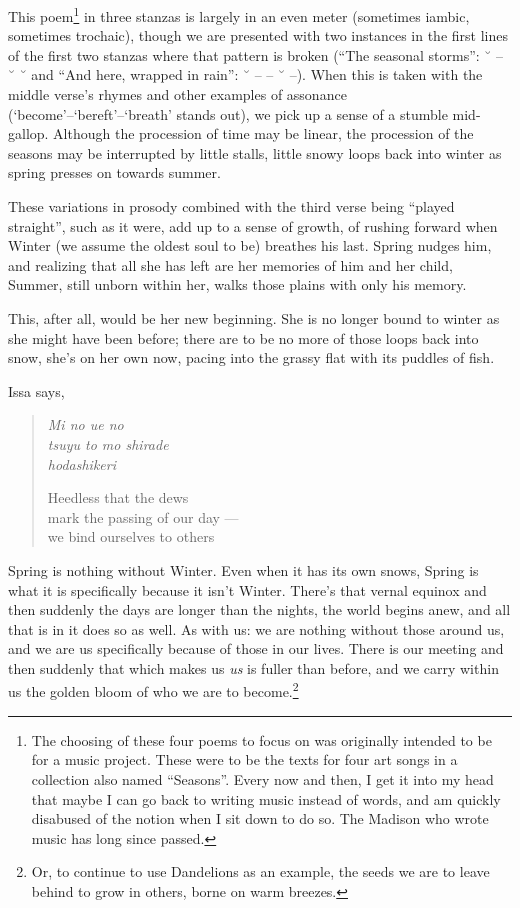 \documentclass[12pt,oneside]{memoir}
\begin{document}
This poem\footnote{The choosing of these four poems to focus on was originally intended to be for a music project. These were to be the texts for four art songs in a collection also named ``Seasons''. Every now and then, I get it into my head that maybe I can go back to writing music instead of words, and am quickly disabused of the notion when I sit down to do so. The Madison who wrote music has long since passed.} in three stanzas is largely in an even meter (sometimes iambic, sometimes trochaic), though we are presented with two instances in the first lines of the first two stanzas where that pattern is broken (``The seasonal storms'': ˘ -- ˘ ˘ and ``And here, wrapped in rain'': ˘ -- -- ˘ --). When this is taken with the middle verse's rhymes and other examples of assonance (`become'--`bereft'--`breath' stands out), we pick up a sense of a stumble mid-gallop. Although the procession of time may be linear, the procession of the seasons may be interrupted by little stalls, little snowy loops back into winter as spring presses on towards summer.

These variations in prosody combined with the third verse being ``played straight'', such as it were, add up to a sense of growth, of rushing forward when Winter (we assume the oldest soul to be) breathes his last. Spring nudges him, and realizing that all she has left are her memories of him and her child, Summer, still unborn within her, walks those plains with only his memory.

This, after all, would be her new beginning. She is no longer bound to winter as she might have been before; there are to be no more of those loops back into snow, she's on her own now, pacing into the grassy flat with its puddles of fish.

Issa says,

\begin{verse}
\begin{multicols}{2}
\emph{Mi no ue no} \\
\emph{tsuyu to mo shirade} \\
\emph{hodashikeri}

\columnbreak

Heedless that the dews \\
mark the passing of our day --- \\
we bind ourselves to others
\end{multicols}
\parencite[11]{issa}
\end{verse}

Spring is nothing without Winter. Even when it has its own snows, Spring is what it is specifically because it isn't Winter. There's that vernal equinox and then suddenly the days are longer than the nights, the world begins anew, and all that is in it does so as well. As with us: we are nothing without those around us, and we are us specifically because of those in our lives. There is our meeting and then suddenly that which makes us \emph{us} is fuller than before, and we carry within us the golden bloom of who we are to become.\footnote{Or, to continue to use Dandelions as an example, the seeds we are to leave behind to grow in others, borne on warm breezes.}
\end{document}
